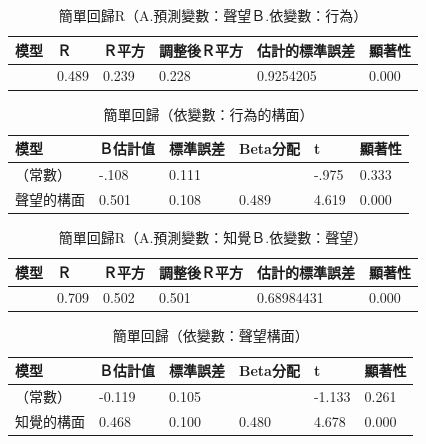 \begin{table}[htb]
\caption{簡單回歸R（A.預測變數：聲望Ｂ.依變數：行為）}
\label{tab:R3}
\renewcommand{\arraystretch}{1.2} %
\arrayrulewidth=1pt               %
\tabcolsep=10pt                   %
\begin{tabular}[t]{llllll}  %
\hline
 模型&Ｒ&Ｒ平方&調整後Ｒ平方&估計的標準誤差&顯著性\\
\hline
&0.489&0.239&0.228&0.9254205&0.000\\
\hline
\end{tabular}
\end{table}


\begin{table}[htb]
\caption{簡單回歸（依變數：行為的構面）}
\label{tab:H2}
\renewcommand{\arraystretch}{1.2} %
\arrayrulewidth=1pt               %
\tabcolsep=10pt                   %
\begin{tabular}[t]{llllll}  %
\hline
 模型&Ｂ估計值&標準誤差&Beta分配&t&顯著性\\
\hline
（常數）&-.108&0.111& &-.975&0.333\\
聲望的構面&0.501&0.108&0.489&4.619&0.000\\
\hline
\end{tabular}
\end{table}

\begin{table}[htb]
\caption{簡單回歸R（A.預測變數：知覺Ｂ.依變數：聲望）}
\label{tab:R3}
\renewcommand{\arraystretch}{1.2} %
\arrayrulewidth=1pt               %
\tabcolsep=10pt                   %
\begin{tabular}[t]{llllll}  %
\hline
 模型&Ｒ&Ｒ平方&調整後Ｒ平方&估計的標準誤差&顯著性\\
\hline
&0.709&0.502&0.501&0.68984431&0.000\\
\hline
\end{tabular}
\end{table}


\begin{table}[htb]
\caption{簡單回歸（依變數：聲望構面）}
\label{tab:H3}
\renewcommand{\arraystretch}{1.2} %
\arrayrulewidth=1pt               %
\tabcolsep=10pt                   %
\begin{tabular}[t]{llllll}  %
\hline
 模型&Ｂ估計值&標準誤差&Beta分配&t&顯著性\\
\hline
（常數）&-0.119&0.105&&-1.133&0.261\\
知覺的構面&0.468&0.100&0.480&4.678&0.000\\
\hline
\end{tabular}
\end{table}

